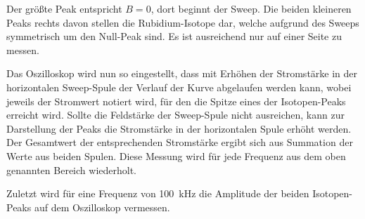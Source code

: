     Der größte Peak entspricht $B = 0$,
    dort beginnt der Sweep.
    Die beiden kleineren Peaks rechts davon stellen die Rubidium-Isotope dar,
    welche aufgrund des Sweeps symmetrisch um den Null-Peak sind.
    Es ist ausreichend nur auf einer Seite zu messen.

    Das Oszilloskop wird nun so eingestellt,
    dass mit Erhöhen der Stromstärke in der horizontalen Sweep-Spule der Verlauf der Kurve abgelaufen werden kann,
    wobei jeweils der Stromwert notiert wird,
    für den die Spitze eines der Isotopen-Peaks erreicht wird.
    Sollte die Feldstärke der Sweep-Spule nicht ausreichen,
    kann zur Darstellung der Peaks die Stromstärke in der horizontalen Spule erhöht werden.
    Der Gesamtwert der entsprechenden Stromstärke ergibt sich aus Summation der Werte aus beiden Spulen.
    Diese Messung wird für jede Frequenz aus dem oben genannten Bereich wiederholt.

    Zuletzt wird für eine Frequenz von \SI{100}{\kilo\hertz} die Amplitude der beiden Isotopen-Peaks auf dem Oszilloskop vermessen.